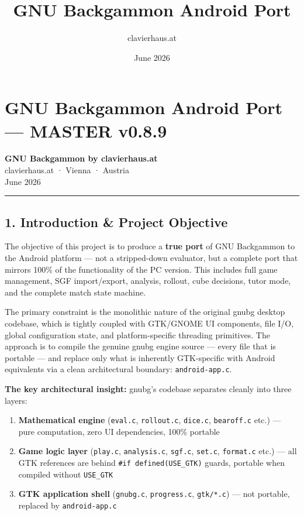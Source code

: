 \documentclass[11pt,a4paper]{article}
\title{\textbf{GNU Backgammon Android Port}}
\author{clavierhaus.at}
\date{June 2026}
\providecommand{\tightlist}{\setlength{\itemsep}{2pt}\setlength{\parskip}{0pt}}
\begin{document}
\maketitle\thispagestyle{fancy}

\tableofcontents\newpage

\section{GNU Backgammon Android Port --- MASTER v0.8.9}\label{gnu-backgammon-android-port-master-v085}

\textbf{GNU Backgammon by clavierhaus.at}\\
clavierhaus.at · Vienna · Austria\\
June 2026

\begin{center}\rule{0.5\linewidth}{0.5pt}\end{center}

\subsection{1. Introduction \& Project Objective}\label{introduction-project-objective}

The objective of this project is to produce a \textbf{true port} of GNU
Backgammon to the Android platform --- not a stripped-down evaluator,
but a complete port that mirrors 100\% of the functionality of the PC
version. This includes full game management, SGF import/export,
analysis, rollout, cube decisions, tutor mode, and the complete match
state machine.

The primary constraint is the monolithic nature of the original gnubg
desktop codebase, which is tightly coupled with GTK/GNOME UI components,
file I/O, global configuration state, and platform-specific threading
primitives. The approach is to compile the genuine gnubg engine source
--- every file that is portable --- and replace only what is inherently
GTK-specific with Android equivalents via a clean architectural
boundary: \texttt{android-app.c}.

\textbf{The key architectural insight:} gnubg's codebase separates
cleanly into three layers:

\begin{enumerate}
\def\labelenumi{\arabic{enumi}.}
\tightlist
\item
  \textbf{Mathematical engine} (\texttt{eval.c}, \texttt{rollout.c},
  \texttt{dice.c}, \texttt{bearoff.c} etc.) --- pure computation, zero
  UI dependencies, 100\% portable
\item
  \textbf{Game logic layer} (\texttt{play.c}, \texttt{analysis.c},
  \texttt{sgf.c}, \texttt{set.c}, \texttt{format.c} etc.) --- all GTK
  references are behind \texttt{\#if\ defined(USE\_GTK)} guards,
  portable when compiled without \texttt{USE\_GTK}
\item
  \textbf{GTK application shell} (\texttt{gnubg.c}, \texttt{progress.c},
  \texttt{gtk/*.c}) --- not portable, replaced by \texttt{android-app.c}
\end{enumerate}
\end{document}
